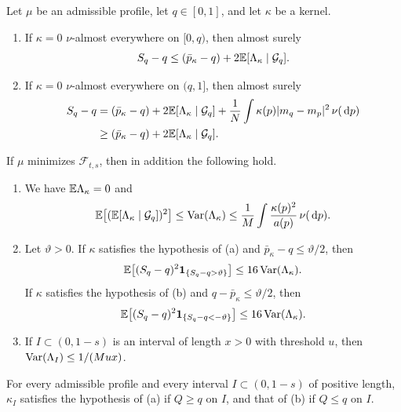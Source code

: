 \begin{lemma}\label{lem:wi-two}
Let $\mu$ be an admissible profile, let $q\in[0,1]$, and let $\kappa$ be
a kernel.
\begin{enumerate}[label=\textup{(\alph*)},series=witwo]
\item If $\kappa=0$ $\nu$-almost everywhere on $[0,q)$, then almost
surely
\[
 S_q-q\le(\bar p_\kappa-q)+2\mathbb E[\Lambda_\kappa\mid\mathcal G_q].
\]
\item If $\kappa=0$ $\nu$-almost everywhere on $(q,1]$, then almost
surely
\[
 \begin{aligned}
 S_q-q&=(\bar p_\kappa-q)+2\mathbb E[\Lambda_\kappa\mid\mathcal G_q]
 +\frac1N\int\kappa(p)|m_q-m_p|^2\,\nu(\,\mathrm d p)\\
 &\ge(\bar p_\kappa-q)+2\mathbb E[\Lambda_\kappa\mid\mathcal G_q].
 \end{aligned}
\]
\end{enumerate}
If $\mu$ minimizes $\mathcal F_{t,s}$, then in addition the following
hold.
\begin{enumerate}[resume*=witwo]
\item We have $\mathbb E\Lambda_\kappa=0$ and
\[
 \mathbb E\bigl[(\mathbb E[\Lambda_\kappa\mid\mathcal G_q])^2\bigr]
 \le\operatorname{Var}(\Lambda_\kappa)
 \le\frac1M\int\frac{\kappa(p)^2}{a(p)}\,\nu(\,\mathrm d p).
\]
\item Let $\vartheta>0$. If $\kappa$ satisfies the hypothesis of
\textup{(a)} and $\bar p_\kappa-q\le\vartheta/2$, then
\[
 \mathbb E\bigl[(S_q-q)^2\mathbf1_{\{S_q-q>\vartheta\}}\bigr]
 \le16\operatorname{Var}(\Lambda_\kappa).
\]
If $\kappa$ satisfies the hypothesis of \textup{(b)} and
$q-\bar p_\kappa\le\vartheta/2$, then
\[
 \mathbb E\bigl[(S_q-q)^2\mathbf1_{\{S_q-q<-\vartheta\}}\bigr]
 \le16\operatorname{Var}(\Lambda_\kappa).
\]
\item If $I\subset(0,1-s)$ is an interval of length $x>0$ with
threshold $u$, then $\operatorname{Var}(\Lambda_I)\le1/(Mux)$.
\end{enumerate}
For every admissible profile and every interval $I\subset(0,1-s)$ of
positive length, $\kappa_I$ satisfies the hypothesis of \textup{(a)} if
$Q\ge q$ on $I$, and that of \textup{(b)} if $Q\le q$ on $I$.
\end{lemma}

